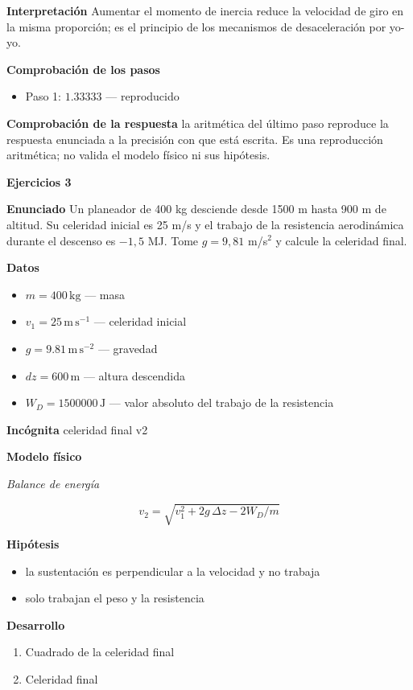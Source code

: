 \documentclass[10pt,openany]{book}
\begin{document}
\noindent\textbf{Interpretación}
Aumentar el momento de inercia reduce la velocidad de giro en la misma proporción; es el principio de los mecanismos de desaceleración por yo-yo.

\noindent\textbf{Comprobación de los pasos}
\begin{itemize}
\item Paso 1: $1.33333$ — reproducido
\end{itemize}

\noindent\textbf{Comprobación de la respuesta} la aritmética del último paso reproduce la respuesta enunciada a la precisión con que está escrita. Es una reproducción aritmética; no valida el modelo físico ni sus hipótesis.

\noindent\textbf{Ejercicios 3}

\noindent\textbf{Enunciado}
Un planeador de 400 kg desciende desde 1500 m hasta 900 m de altitud. Su celeridad inicial es 25 m/s y el trabajo de la resistencia aerodinámica durante el descenso es \(-1{,}5\) MJ. Tome \(g = 9{,}81\) m/s\(^2\) y calcule la celeridad final.

\noindent\textbf{Datos}
\begin{itemize}
\item $m = 400\,\mathrm{kg}$ — masa
\item $v_{1} = 25\,\mathrm{m}\,\mathrm{s}^{-1}$ — celeridad inicial
\item $g = 9.81\,\mathrm{m}\,\mathrm{s}^{-2}$ — gravedad
\item $dz = 600\,\mathrm{m}$ — altura descendida
\item $W_{D} = 1500000\,\mathrm{J}$ — valor absoluto del trabajo de la resistencia
\end{itemize}

\noindent\textbf{Incógnita}
celeridad final v2

\noindent\textbf{Modelo físico}

\noindent\textit{Balance de energía}

\[
v_2 = \sqrt{v_1^{2} + 2 g\,\Delta z - 2W_D/m}
\]

\noindent\textbf{Hipótesis}
\begin{itemize}
\item la sustentación es perpendicular a la velocidad y no trabaja
\item solo trabajan el peso y la resistencia
\end{itemize}

\noindent\textbf{Desarrollo}
\begin{enumerate}
\item
Cuadrado de la celeridad final
\item
Celeridad final
\end{enumerate}
\end{document}
